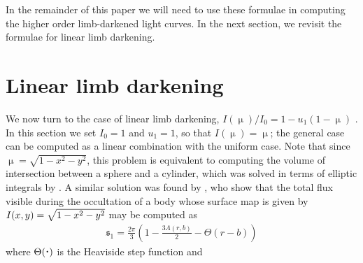 \documentclass[modern]{aastex61}
\begin{document}
In the remainder of this paper we will need to use these formulae in computing
the higher order limb-darkened light curves.  In the next section, we revisit the formulae
for linear limb darkening.

\section{Linear limb darkening}
\label{sec:reparam}

We now turn to the case of linear limb darkening, $I(\upmu)/I_0 = 1-u_1(1-\upmu)$
\citep{Russell1912a,Russell1912b}.  In this section we set $I_0=1$ and $u_1=1$, so
that $I(\upmu)=\upmu$;  the general case can be computed as a linear
combination with the uniform case.
Note that since $\upmu = \sqrt{1-x^2-y^2}$, this problem is equivalent to
computing the volume of intersection between a sphere and a cylinder, which was
solved in terms of elliptic integrals by \citet{Lamarche1990}.
A similar solution was found by \citet{MandelAgol2002}, who show that the total
flux visible during the occultation of a body whose surface map is given by
$I(x, y) = \sqrt{1 - \mbox{$x$}^2 -\mbox{$y$}^2}$ may be computed as
%
\begin{align}
    \label{eq:s1}
    \mathfrak{s}_1 = \frac{2\pi}{3} \left(1 - \frac{3\Lambda(r,b)}{2} - \Theta(r - b) \right)
\end{align}
%
where $\Theta(\bigdot)$ is the Heaviside step function and
%
\begingroup\makeatletter\def\f@size{10}\check@mathfonts
\def\maketag@@@#1{\hbox{\m@th\normalsize#1}}%
\end{document}
